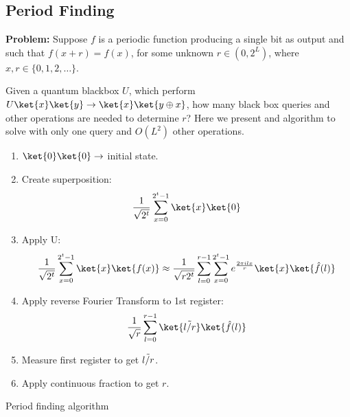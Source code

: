 \subsection{Period Finding}
\label{subsec: Period Finding}

\textbf{Problem:} Suppose $f$ is a periodic function producing a single bit as output and such that $f(x+r) = f(x)$, for some unknown $r \in (0, 2^L)$, where $x,r \in \{ 0,1,2, \dots \}$.

Given a quantum blackbox $U$, which perform $U\ket{x} \ket{y} \rightarrow \ket{x} \ket{y \oplus x} $, how many black box queries and other operations are needed to determine $r$? Here we present and algorithm to solve with only one query and $O(L^2)$ other operations.

\begin{algorithm}[H]
\SetAlgoLined
{}

\begin{enumerate}
    \item $\ket{0}\ket{0} \rightarrow$ initial state.
    \item Create superposition: 
    \begin{equation*}
        \frac{1}{\sqrt{2^t}} \sum_{x=0}^{2^t-1} \ket{x} \ket{0}
    \end{equation*}
    \item Apply U:
    \begin{equation*}
        \frac{1}{\sqrt{2^t}} \sum_{x=0}^{2^t-1} \ket{x} \ket{f(x)} \approx \frac{1}{\sqrt{r 2^t}} \sum_{l=0}^{r-1} \sum_{x=0}^{2^t-1} e^{\frac{2 \pi i l x}{r}} \ket{x} \ket{\hat{f}(l)}
    \end{equation*}
    \item Apply reverse Fourier Transform to 1st register:
    \begin{equation*}
        \frac{1}{\sqrt{r}} \sum_{l=0}^{r-1} \ket{\Tilde{l/r}} \ket{\hat{f}(l)}
    \end{equation*}
    \item Measure first register to get $\Tilde{l/r}$.
    \item Apply continuous fraction to get $r$.
\end{enumerate}
\caption{Period finding algorithm}
\end{algorithm}

